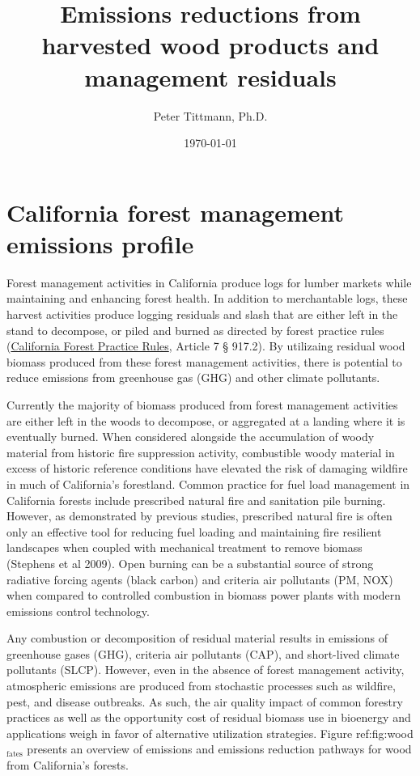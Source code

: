 \documentclass[a4paper]{article}
\author{Peter Tittmann, Ph.D.}
\date{\today}
\title{Emissions reductions from harvested wood products and management residuals}
\begin{document}
\maketitle
\tableofcontents

\pagebreak
\section{California forest management emissions profile}
\label{sec-1}

Forest management activities in California produce logs for lumber markets while maintaining and enhancing forest health. In addition to merchantable logs, these harvest activities produce logging residuals and slash that are either left in the stand to decompose, or piled and burned as directed by forest practice rules (\href{http://calfire.ca.gov/resource_mgt/downloads/2013_FP_Rulebook_with_Tech_RuleNo1.pdf}{California Forest Practice Rules}, Article 7 §
917.2). By utilizaing residual wood biomass produced from these forest management activities, there is potential to reduce emissions from greenhouse gas (GHG) and other climate pollutants.

Currently the majority of biomass produced from forest management activities are either left  in the woods to decompose, or aggregated at a landing where it is eventually burned. When considered alongside the accumulation of woody material from historic fire suppression activity, combustible woody material in excess of historic reference conditions have elevated the risk of damaging wildfire in much of California’s forestland. Common practice for fuel load management in California forests include prescribed natural fire and sanitation pile burning. However, as demonstrated by previous studies, prescribed natural fire is often only an effective tool for reducing fuel loading and maintaining fire resilient landscapes when coupled with mechanical treatment to remove biomass (Stephens et al 2009). Open burning can be a substantial source of strong radiative forcing agents (black carbon) and criteria air pollutants (PM, NOX) when compared to controlled combustion in biomass power plants with modern emissions control technology. 

Any combustion or decomposition of residual material results in emissions of greenhouse gases (GHG), criteria air pollutants (CAP), and short-lived climate pollutants (SLCP). However, even in the absence of forest management activity, atmospheric emissions are produced from 
stochastic processes such as wildfire, pest, and disease outbreaks. As such, the air quality impact of common forestry practices as well as the opportunity cost of residual biomass use in bioenergy and applications weigh in favor of alternative utilization strategies. Figure ref:fig:wood$_{\text{fates}}$ presents an overview of emissions and emissions reduction pathways for wood from California's forests. 
\end{document}
